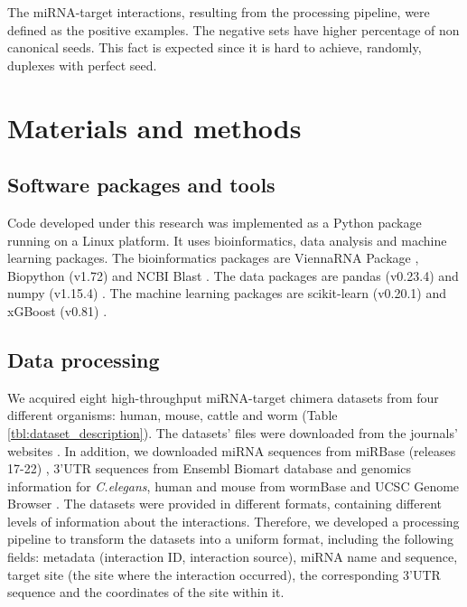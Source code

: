 \documentclass{bmcart}
\begin{document}
The miRNA-target interactions, resulting from the processing pipeline, were defined as the positive examples.
The negative sets have higher percentage of non canonical seeds. This fact is expected since it is hard to achieve, randomly, duplexes with perfect seed.


\section*{Materials and methods}
\subsection*{Software packages and tools}
Code developed under this research was implemented as a Python package running on a Linux platform. It uses bioinformatics, data analysis and machine learning packages. The bioinformatics packages are ViennaRNA Package \cite{lorenz2011viennarna}, Biopython (v1.72) \cite{cock2009biopython} and NCBI Blast \cite{altschul1990basic_blast}. The data packages are pandas (v0.23.4) \cite{mckinney2010data_pandas} and numpy (v1.15.4) \cite{oliphant2006guide_numpy}. The machine learning packages are scikit-learn (v0.20.1) \cite{pedregosa2011scikit} and xGBoost (v0.81) \cite{xgboost}.




\subsection*{Data processing}

We acquired eight high-throughput miRNA-target chimera datasets from four different organisms: human, mouse, cattle and worm (Table \ref{tbl:dataset_description}). The datasets' files were downloaded from the journals' websites \cite{scheel2017global, grosswendt2014unambiguous, broughton2016pairing, Helwak2014, darnell_moore2015mirna}. In addition, we downloaded miRNA sequences from miRBase (releases 17-22) \cite{kozomara2013mirbase},  3'UTR sequences from Ensembl Biomart database \cite{smedley2015biomart} and genomics information for \textit{C.elegans}, human and mouse from wormBase \cite{lee2017wormbase} and UCSC Genome Browser \cite{karolchik2004ucsc}.
The datasets were provided in different formats, containing different levels of information about the interactions. Therefore, we developed a processing pipeline to transform the datasets into a uniform format, including the following fields: metadata (interaction ID, interaction source), miRNA name and sequence, target site (the site where the interaction occurred), the corresponding 3'UTR sequence and the coordinates of the site within it.
\end{document}
